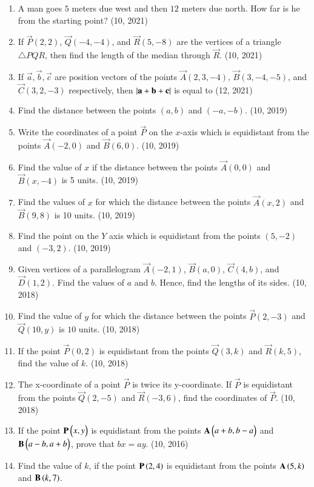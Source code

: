 \begin{enumerate}[label=\thesubsection.\arabic*, ref=\thesubsection.\theenumi]
	\item A man goes $5$ meters due west and then $12$ meters due north. How far is he from the starting point? \hfill (10, 2021)
		\item If $\vec{P}(2, 2)$, $\vec{Q}(-4, -4)$, and $\vec{R}(5, -8)$ are the vertices of a triangle $\triangle PQR$, then find the length of the median through $\vec{R}$. \hfill (10, 2021)
	\item If $\vec{a}, \vec{b}, \vec{c}$ are position vectors of the points $\vec{A}(2, 3, -4)$, $\vec{B}(3, -4, -5)$, and $\vec{C}(3, 2, -3)$ respectively, then $\left\vert\mathbf{a}+\mathbf{b}+\mathbf{c}\right\vert$ is equal to
	\hfill (12, 2021)
\item Find the distance between the points $(a, b)$ and $(-a, -b)$. \hfill (10, 2019)
\item Write the coordinates of a point $\vec{P}$ on the $x$-axis which is equidistant from the points $\vec{A}(-2, 0)$ and $\vec{B}(6, 0)$. \hfill (10, 2019)
\item Find the value of $x$ if the distance between the points $\vec{A}(0, 0)$ and $\vec{B}(x, -4)$ is 5 units. \hfill (10, 2019)
\item Find the values of $x$ for which the distance between the points $\vec{A}(x, 2)$ and $\vec{B}(9, 8)$ is 10 units. \hfill (10, 2019)
\item Find the point on the $Y$ axis which is equidistant from the points $(5, -2)$ and $(-3, 2)$. \hfill (10, 2019)
    \item Given vertices of a parallelogram $\vec{A}(-2,1)$, $\vec{B}(a,0)$, $\vec{C}(4,b)$, and $\vec{D}(1,2)$. Find the values of $a$ and $b$. Hence, find the lengths of its sides. \hfill (10, 2018)
    \item Find the value of $y$ for which the distance between the points $\vec{P}(2,-3)$ and $\vec{Q}(10,y)$ is $10$ units. \hfill (10, 2018)
    \item If the point $\vec{P}(0,2)$ is equidistant from the points $\vec{Q}(3,k)$ and $\vec{R}(k,5)$, find the value of $k$. \hfill (10, 2018)
    \item The x-coordinate of a point $\vec{P}$ is twice its y-coordinate. If $\vec{P}$ is equidistant from the points $\vec{Q}(2,-5)$ and $\vec{R}(-3,6)$, find the coordinates of $\vec{P}$. \hfill (10, 2018)
    \item If the point $\mathbf{P} \begin{pmatrix}x, y\end{pmatrix}$ is equidistant from the points $\mathbf{A} \begin{pmatrix}a+b, b-a\end{pmatrix}$ and $\mathbf{B} \begin{pmatrix}a-b, a+b\end{pmatrix}$, prove that $bx = ay$. \hfill (10, 2016)
\item Find the value of $k$, if the point $\mathbf{P}\left(2,4\right)$ is equidistant from the points $\mathbf{A}\left(5,k\right)$ and $\mathbf{B}\left(k,7\right)$. 

\end{enumerate}
